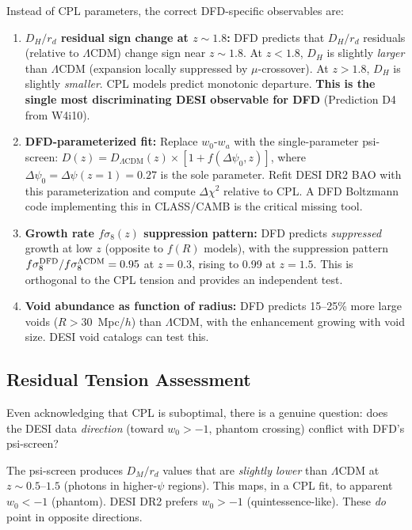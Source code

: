 \documentclass[11pt,a4paper]{article}
\newcommand{\LCDM}{$\Lambda$CDM}
\begin{document}
Instead of CPL parameters, the correct DFD-specific observables are:

\begin{enumerate}
\item \textbf{$D_H/r_d$ residual sign change at $z \sim 1.8$:}
  DFD predicts that $D_H/r_d$ residuals (relative to \LCDM{}) change
  sign near $z \sim 1.8$. At $z < 1.8$, $D_H$ is slightly \emph{larger}
  than \LCDM{} (expansion locally suppressed by $\mu$-crossover). At
  $z > 1.8$, $D_H$ is slightly \emph{smaller}. CPL models predict
  monotonic departure. \textbf{This is the single most discriminating
  DESI observable for DFD} (Prediction D4 from W4i10).

\item \textbf{DFD-parameterized fit:} Replace $w_0$-$w_a$ with the
  single-parameter psi-screen: $D(z) = D_{\Lambda\text{CDM}}(z)
  \times [1 + f(\Delta\psi_0, z)]$, where $\Delta\psi_0 =
  \Delta\psi(z=1) = 0.27$ is the sole parameter. Refit DESI DR2 BAO
  with this parameterization and compute $\Delta\chi^2$ relative to
  CPL. A DFD Boltzmann code implementing this in CLASS/CAMB is the
  critical missing tool.

\item \textbf{Growth rate $f\sigma_8(z)$ suppression pattern:}
  DFD predicts \emph{suppressed} growth at low $z$ (opposite to $f(R)$
  models), with the suppression pattern $f\sigma_8^{\rm DFD}/
  f\sigma_8^{\Lambda\text{CDM}} = 0.95$ at $z = 0.3$, rising to
  0.99 at $z = 1.5$. This is orthogonal to the CPL tension and
  provides an independent test.

\item \textbf{Void abundance as function of radius:} DFD predicts
  15--25\% more large voids ($R > 30$~Mpc/$h$) than \LCDM{}, with the
  enhancement growing with void size. DESI void catalogs can test this.
\end{enumerate}

\subsection{Residual Tension Assessment}

Even acknowledging that CPL is suboptimal, there is a genuine question:
does the DESI data \emph{direction} (toward $w_0 > -1$, phantom
crossing) conflict with DFD's psi-screen?

The psi-screen produces $D_M/r_d$ values that are \emph{slightly lower}
than \LCDM{} at $z \sim 0.5$--$1.5$ (photons in higher-$\psi$ regions).
This maps, in a CPL fit, to apparent $w_0 < -1$ (phantom). DESI DR2
prefers $w_0 > -1$ (quintessence-like). These \emph{do} point in
opposite directions.
\end{document}
